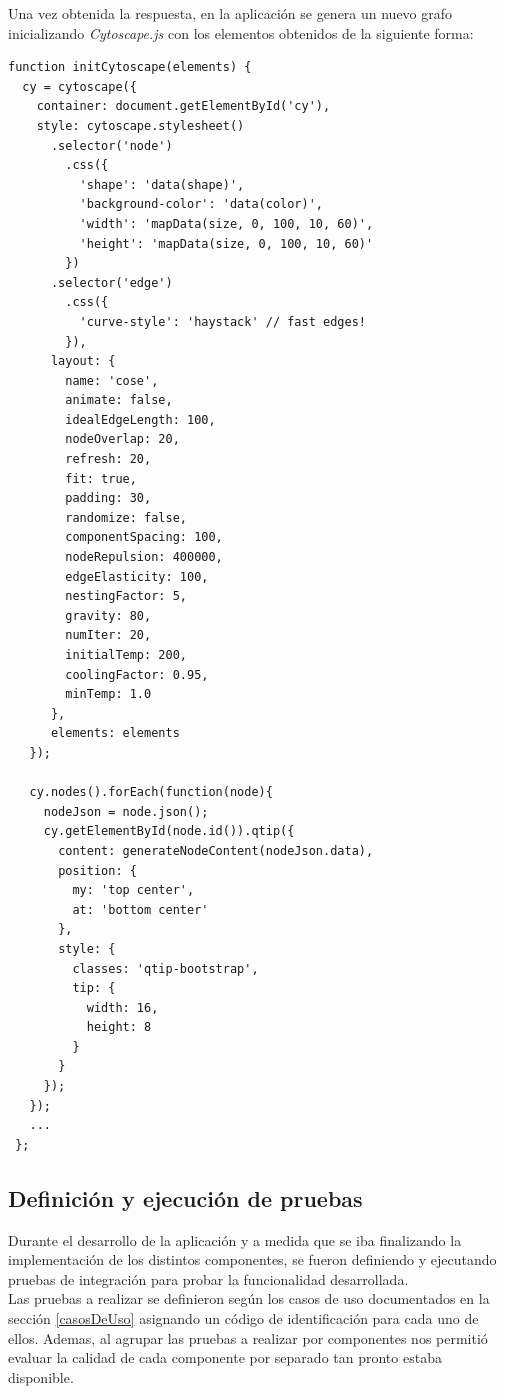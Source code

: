 \documentclass[11pt,a4paper]{article}
\begin{document}
Una vez obtenida la respuesta, en la aplicación se genera un nuevo grafo inicializando \textit{Cytoscape.js} con los elementos obtenidos de la siguiente forma:
\begin{lstlisting}[style=C]
function initCytoscape(elements) {
  cy = cytoscape({
    container: document.getElementById('cy'),
    style: cytoscape.stylesheet()
      .selector('node')
        .css({
          'shape': 'data(shape)',
          'background-color': 'data(color)',
          'width': 'mapData(size, 0, 100, 10, 60)',
          'height': 'mapData(size, 0, 100, 10, 60)'
        })
      .selector('edge')
        .css({
          'curve-style': 'haystack' // fast edges!
        }),
      layout: {
        name: 'cose',
        animate: false,
        idealEdgeLength: 100,
        nodeOverlap: 20,
        refresh: 20,
        fit: true,
        padding: 30,
        randomize: false,
        componentSpacing: 100,
        nodeRepulsion: 400000,
        edgeElasticity: 100,
        nestingFactor: 5,
        gravity: 80,
        numIter: 20,
        initialTemp: 200,
        coolingFactor: 0.95,
        minTemp: 1.0
      },
      elements: elements
   });
   
   cy.nodes().forEach(function(node){
     nodeJson = node.json();
     cy.getElementById(node.id()).qtip({
       content: generateNodeContent(nodeJson.data),
       position: {
         my: 'top center',
         at: 'bottom center'
       },
       style: {
         classes: 'qtip-bootstrap',
         tip: {
           width: 16,
           height: 8
         }
       }
     });
   });
   ...
 };
\end{lstlisting}
\medskip 

\subsection{Definición y ejecución de pruebas}
Durante el desarrollo de la aplicación y a medida que se iba finalizando la implementación de los distintos componentes, se fueron definiendo y ejecutando pruebas de integración para probar la funcionalidad desarrollada.
\\

Las pruebas a realizar se definieron según los casos de uso documentados en la sección \ref{casosDeUso} asignando un código de identificación para cada uno de ellos. Ademas, al agrupar las pruebas a realizar por componentes nos permitió evaluar la calidad de cada componente por separado tan pronto estaba disponible.
\\
\end{document}

